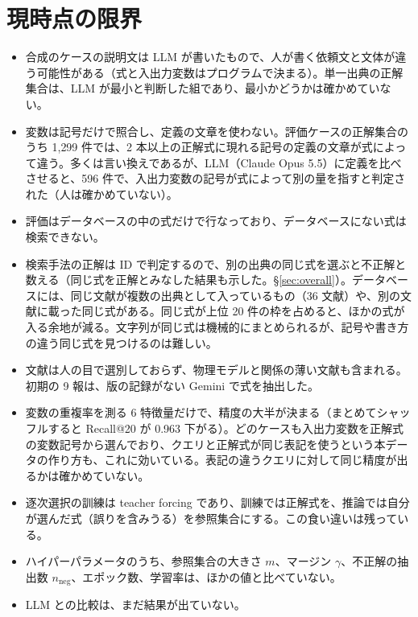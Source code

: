 \documentclass[11pt,a4paper]{ltjsarticle}
\begin{document}
\section{現時点の限界}\label{sec:limits}
\begin{itemize}[leftmargin=1.5em]
  \item 合成のケースの説明文は LLM が書いたもので、人が書く依頼文と文体が違う可能性がある（式と入出力変数はプログラムで決まる）。単一出典の正解集合は、LLM が最小と判断した組であり、最小かどうかは確かめていない。
  \item 変数は記号だけで照合し、定義の文章を使わない。評価ケースの正解集合のうち 1{,}299 件では、2 本以上の正解式に現れる記号の定義の文章が式によって違う。多くは言い換えであるが、LLM（Claude Opus 5.5）に定義を比べさせると、596 件で、入出力変数の記号が式によって別の量を指すと判定された（人は確かめていない）。
  \item 評価はデータベースの中の式だけで行なっており、データベースにない式は検索できない。
  \item 検索手法の正解は ID で判定するので、別の出典の同じ式を選ぶと不正解と数える（同じ式を正解とみなした結果も示した。\S\ref{sec:overall}）。データベースには、同じ文献が複数の出典として入っているもの（36 文献）や、別の文献に載った同じ式がある。同じ式が上位 20 件の枠を占めると、ほかの式が入る余地が減る。文字列が同じ式は機械的にまとめられるが、記号や書き方の違う同じ式を見つけるのは難しい。
  \item 文献は人の目で選別しておらず、物理モデルと関係の薄い文献も含まれる。初期の 9 報は、版の記録がない Gemini で式を抽出した。
  \item 変数の重複率を測る 6 特徴量だけで、精度の大半が決まる（まとめてシャッフルすると Recall@20 が 0.963 下がる）。どのケースも入出力変数を正解式の変数記号から選んでおり、クエリと正解式が同じ表記を使うという本データの作り方も、これに効いている。表記の違うクエリに対して同じ精度が出るかは確かめていない。
  \item 逐次選択の訓練は teacher forcing であり、訓練では正解式を、推論では自分が選んだ式（誤りを含みうる）を参照集合にする。この食い違いは残っている。
  \item ハイパーパラメータのうち、参照集合の大きさ $m$、マージン $\gamma$、不正解の抽出数 $n_{\mathrm{neg}}$、エポック数、学習率は、ほかの値と比べていない。
  \item LLM との比較は、まだ結果が出ていない。
\end{itemize}
\end{document}
